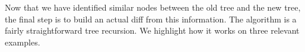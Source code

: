 Now that we have identified similar nodes between the old tree and the new tree,
the final step is to build an actual diff from this information.  The algorithm
is a fairly straightforward tree recursion.  We highlight how it works on three
relevant examples.


